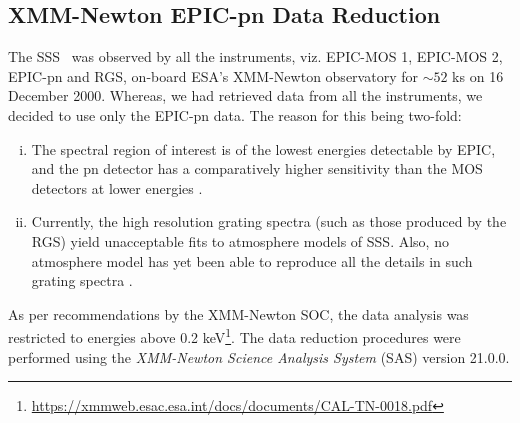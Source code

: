     	\subsection{XMM-Newton EPIC-pn Data Reduction} \label{multi-obs:red-analysis:epic-pn}
    		The SSS \source\ was observed by all the instruments, viz. EPIC-MOS 1, EPIC-MOS 2, EPIC-pn and RGS, on-board ESA's XMM-Newton observatory for $\sim 52$ ks on 16 December 2000. Whereas, we had retrieved data from all the instruments, we decided to use only the EPIC-pn data. The reason for this being two-fold:
	    	\begin{enumerate}[i.]
	    		\item The spectral region of interest is of the lowest energies detectable by EPIC, and the pn detector has a comparatively higher sensitivity than the MOS detectors at lower energies \cite{stecchini2023revisiting,mateos2009statistical}.
	    		\item Currently, the high resolution grating spectra (such as those produced by the RGS) yield unacceptable fits to atmosphere models of SSS. Also, no atmosphere model has yet been able to reproduce all the details in such grating spectra \cite{ness2020complications}.
	    	\end{enumerate}
	    	As per recommendations by the XMM-Newton SOC, the data analysis was restricted to energies above 0.2 keV\footnote{\url{https://xmmweb.esac.esa.int/docs/documents/CAL-TN-0018.pdf}}. The data reduction procedures were performed using the \textit{XMM-Newton Science Analysis System} (SAS) version 21.0.0.
	    
